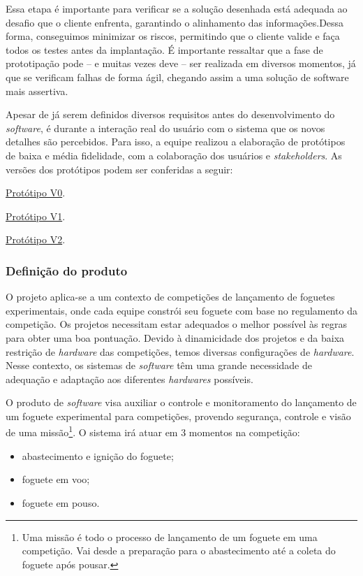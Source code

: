 Essa etapa é importante para verificar se a solução desenhada está adequada ao desafio que o cliente enfrenta, garantindo o alinhamento das informações.Dessa forma, conseguimos minimizar os riscos, permitindo que o cliente valide e faça todos os testes antes da implantação. É importante ressaltar que a fase de prototipação pode – e muitas vezes deve – ser realizada em diversos momentos, já que se verificam falhas de forma ágil, chegando assim a uma solução de software mais assertiva.

Apesar de já serem definidos diversos requisitos antes do desenvolvimento do \textit{software}, é durante a interação real do usuário com o sistema que os novos detalhes são percebidos. Para isso, a equipe realizou a elaboração de protótipos de baixa e média fidelidade, com a colaboração dos usuários e \textit{stakeholders}. As versões dos protótipos podem ser conferidas a seguir:


\href{https://bit.ly/35xe23N}{Protótipo V0}.

\href{https://bit.ly/2FW3oep}{Protótipo V1}.

\href{https://bit.ly/34pAfS2}{Protótipo V2}.

\subsubsection{Definição do produto}

O projeto aplica-se a um contexto de competições de lançamento de foguetes experimentais, onde cada equipe constrói seu foguete com base no regulamento da competição. Os projetos necessitam estar adequados o melhor possível às regras para obter uma boa pontuação. Devido à dinamicidade dos projetos e da baixa restrição de \textit{hardware} das competições, temos diversas configurações de \textit{hardware}. Nesse contexto, os sistemas de \textit{software} têm uma grande necessidade de adequação e adaptação aos diferentes \textit{hardwares} possíveis.

O produto de \textit{software} visa auxiliar o controle e monitoramento do lançamento de um foguete experimental para competições, provendo segurança, controle e visão de uma missão\footnote{Uma missão é todo o processo de lançamento de um foguete em uma competição. Vai desde a preparação para o abastecimento até a coleta do foguete após pousar.}. O sistema irá atuar em 3 momentos na competição:
\begin{itemize}
    \item abastecimento e ignição do foguete;
    \item foguete em voo;
    \item foguete em pouso.
\end{itemize}

